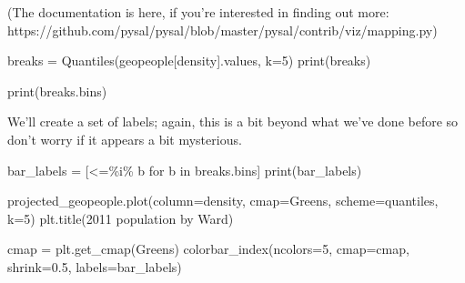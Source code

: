 \documentclass[
  letterpaper,
  DIV=11,
  numbers=noendperiod]{scrreprt}
\newenvironment{Shaded}{\begin{snugshade}}{\end{snugshade}}
\newcommand{\BuiltInTok}[1]{\textcolor[rgb]{0.00,0.23,0.31}{#1}}
\newcommand{\ControlFlowTok}[1]{\textcolor[rgb]{0.00,0.23,0.31}{#1}}
\newcommand{\DecValTok}[1]{\textcolor[rgb]{0.68,0.00,0.00}{#1}}
\newcommand{\FloatTok}[1]{\textcolor[rgb]{0.68,0.00,0.00}{#1}}
\newcommand{\KeywordTok}[1]{\textcolor[rgb]{0.00,0.23,0.31}{#1}}
\newcommand{\NormalTok}[1]{\textcolor[rgb]{0.00,0.23,0.31}{#1}}
\newcommand{\OperatorTok}[1]{\textcolor[rgb]{0.37,0.37,0.37}{#1}}
\newcommand{\SpecialCharTok}[1]{\textcolor[rgb]{0.37,0.37,0.37}{#1}}
\newcommand{\StringTok}[1]{\textcolor[rgb]{0.13,0.47,0.30}{#1}}
\begin{document}
(The documentation is here, if you're interested in finding out more:
https://github.com/pysal/pysal/blob/master/pysal/contrib/viz/mapping.py)

\begin{Shaded}
\begin{Highlighting}[]
\NormalTok{breaks }\OperatorTok{=}\NormalTok{ Quantiles(geopeople[}\StringTok{\textquotesingle{}density\textquotesingle{}}\NormalTok{].values, k}\OperatorTok{=}\DecValTok{5}\NormalTok{)}
\BuiltInTok{print}\NormalTok{(breaks)}
\end{Highlighting}
\end{Shaded}

\begin{Shaded}
\begin{Highlighting}[]
\BuiltInTok{print}\NormalTok{(breaks.bins)}
\end{Highlighting}
\end{Shaded}

We'll create a set of labels; again, this is a bit beyond what we've
done before so don't worry if it appears a bit mysterious.

\begin{Shaded}
\begin{Highlighting}[]
\NormalTok{bar\_labels }\OperatorTok{=}\NormalTok{ [}\StringTok{\textquotesingle{}\textless{}=}\SpecialCharTok{\%i}\StringTok{\textquotesingle{}}\OperatorTok{\%}\NormalTok{ b }\ControlFlowTok{for}\NormalTok{ b }\KeywordTok{in}\NormalTok{ breaks.bins]}
\BuiltInTok{print}\NormalTok{(bar\_labels)}
\end{Highlighting}
\end{Shaded}

\begin{Shaded}
\begin{Highlighting}[]
\NormalTok{projected\_geopeople.plot(column}\OperatorTok{=}\StringTok{\textquotesingle{}density\textquotesingle{}}\NormalTok{, cmap}\OperatorTok{=}\StringTok{\textquotesingle{}Greens\textquotesingle{}}\NormalTok{, scheme}\OperatorTok{=}\StringTok{\textquotesingle{}quantiles\textquotesingle{}}\NormalTok{, k}\OperatorTok{=}\DecValTok{5}\NormalTok{)}
\NormalTok{plt.title(}\StringTok{\textquotesingle{}2011 population by Ward\textquotesingle{}}\NormalTok{)}

\NormalTok{cmap }\OperatorTok{=}\NormalTok{ plt.get\_cmap(}\StringTok{\textquotesingle{}Greens\textquotesingle{}}\NormalTok{)}
\NormalTok{colorbar\_index(ncolors}\OperatorTok{=}\DecValTok{5}\NormalTok{, cmap}\OperatorTok{=}\NormalTok{cmap, shrink}\OperatorTok{=}\FloatTok{0.5}\NormalTok{, labels}\OperatorTok{=}\NormalTok{bar\_labels)}
\end{Highlighting}
\end{Shaded}
\end{document}
